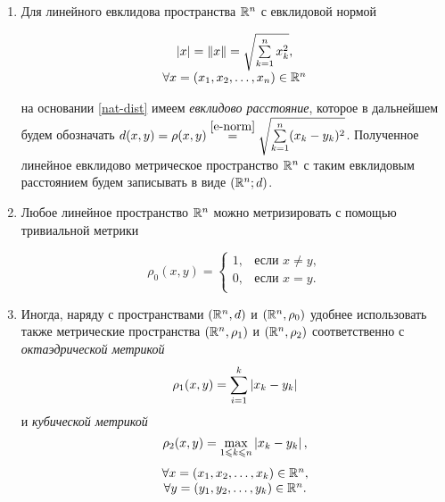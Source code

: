 \documentclass[../../main.tex]{subfiles}
\begin{document}
\begin{rems} 

 \quad

 \begin{enumerate}
  \item  Для линейного евклидова пространства $\mathbb{R}^n$ с евклидовой
  нормой
  
  \begin{equation}
   \label{e-norm}
   \begin{array}{c}
    \left|{x}\right| = \lVert{x}\rVert = \sqrt{\sum\limits_{k=1}^n x_k^2}, \\
    \forall x = (x_1, x_2, \dots, x_n) \in \mathbb{R}^n
   \end{array}
  \end{equation}
  
  на основании \eqref{nat-dist} имеем \emph{евклидово 
  расстояние}, которое
  в дальнейшем будем обозначать $d(x, y) = \rho(x, y) \stk{e-norm}{=}
  \sqrt{\sum\limits_{k=1}^n (x_k - y_k)^2}$. Полученное линейное евклидово 
  метрическое пространство $\mathbb{R}^n$ с таким евклидовым расстоянием 
  будем записывать в виде $(\mathbb{R}^n; d)$.
  
  \item Любое линейное пространство $\mathbb{R}^n$ можно метризировать с
  помощью тривиальной метрики
  
  \[
   \rho_0(x, y) =
   \begin{cases}
    1, & \text{если } x \ne y, \\
    0, & \text{если } x = y. \\
   \end{cases}
  \]
  
  \item Иногда, наряду с пространствами $(\mathbb{R}^n, d)$ и $(\mathbb{R}^n, \rho_0)$
  удобнее использовать также метрические пространства $(\mathbb{R}^n, \rho_1)$
  и $(\mathbb{R}^n, \rho_2)$ соответственно с \emph{октаэдрической метрикой}
  \[\rho_1(x, y) = \sum_{i=1}^k \left|{x_k - y_k}\right|\]
  и \emph{кубической метрикой}
  \[\rho_2(x, y) = \max_{1 \leqslant k \leqslant n} \left|{x_k - y_k}\right|,\]
  \[\begin{array}{c}
     \forall x = (x_1, x_2, \dots, x_k) \in \mathbb{R}^n, \\
     \forall y = (y_1, y_2, \dots, y_k) \in \mathbb{R}^n. \\
    \end{array}\]
 \end{enumerate}

\end{rems}
\end{document}
